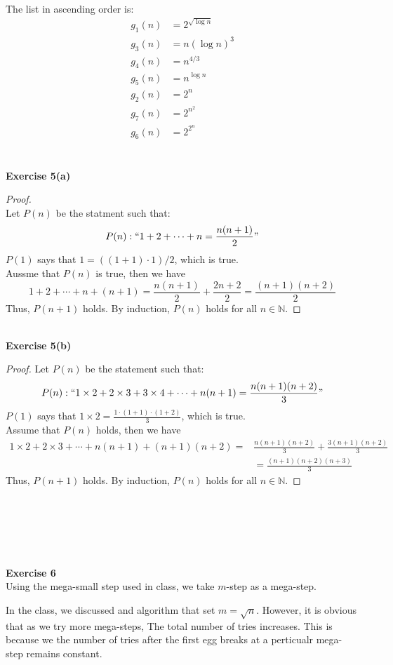 \documentclass[11pt]{amsart}
\theoremstyle{theorem}
\newcommand\N{\mathbb{N}}
\begin{document}
The list in ascending order is:
\begin{align*}
g_1(n) &= 2^{\sqrt{\log n}}\\
g_3(n) &= n(\log n)^3\\
g_4(n) &= n^{4/3}\\
g_5(n) &= n^{\log n}\\
g_2(n) &= 2^n\\
g_7(n) &= 2^{n^2}\\
g_6(n) &=2^{2^n}
\end{align*}\\\\
\textbf{Exercise 5(a)}

\begin{proof}
\hfill\\
Let $ P(n) $ be the statment such that:\[ P(n): ``1+2+\cdots + n = \frac{n(n+1)}{2}" \]
$ P(1) $ says that $ 1 = ((1+1) \cdot 1)/2$, which is true.\\
Aussme that $ P(n)$ is true, then we have
\[
1 + 2 + \cdots + n + (n+1) = \frac{n(n+1)}{2}+ \frac{2n+2}{2} = \frac{(n+1)(n+2)}{2}
\]
Thus, $ P(n+1) $ holds. By induction, $ P(n) $ holds for all $ n \in \N $.
\end{proof}\hfill\\
\textbf{Exercise 5(b)}

\begin{proof}
Let $ P(n) $ be the statement such that:\[ P(n): ``1 \times 2 + 2\times 3 + 3\times 4 + \cdots + n(n+1) = \frac{n(n+1)(n+2)}{3}" \]
$ P(1) $ says that $ 1\times 2 = \frac{1\cdot(1+1)\cdot (1+2)}{3} $, which is true.\\
Assume that $ P(n) $ holds, then we have
\begin{align*}
1 \times 2 + 2\times 3 + \cdots + n(n+1) + (n+1)(n+2) =& \frac{n(n+1)(n+2)}{3} + \frac{3(n+1)(n+2)}{3} \\
&= \frac{(n+1)(n+2)(n+3)}{3}
\end{align*}
Thus, $ P(n+1) $ holds. By induction, $ P(n) $ holds for all $ n \in \N $.
\end{proof}\hfill\\\\\\\\\\
\textbf{Exercise 6}\hfill\\
Using the mega-small step used in class, we take $ m $-step as a mega-step.

In the class, we discussed and algorithm that set $ m  = \sqrt{n} $. However, it is obvious that as we try more mega-steps, The total number of tries increases. This is because we the number of tries after the first egg breaks at a perticualr mega-step remains constant.
\end{document}
